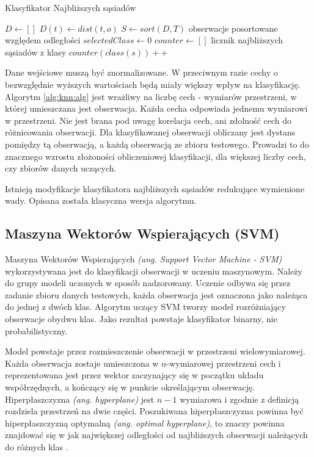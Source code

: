 \documentclass[a4paper,12pt,twoside,openany]{report}
\newcommand{\ang}[1]{\textit{(ang. #1)}}
\begin{document}
\begin{algorithm}
	\caption{Klasyfikator Najbliższych sąsiadów}
	\begin{algorithmic}[1]
		\State $D \leftarrow []$
		\State $D(t) \leftarrow dist(t, o)$
		\EndFor
		\State $S \leftarrow sort(D, T)$ \Comment obserwacje posortowane względem odległości
		\State $selectedClass \leftarrow 0$
		\State $counter \leftarrow []$ \Comment licznik najbliższych sąsiadów z klasy
		\Repeat
		\State $counter(class(s))++$
		\EndFor
		\EndProcedure
	\end{algorithmic}
	\label{alg:knn:alg}
\end{algorithm}

Dane wejściowe muszą być znormalizowane. 
W przeciwnym razie cechy o bezwzględnie wyższych wartościach będą miały większy wpływ na klasyfikację.
Algorytm \ref{alg:knn:alg} jest wrażliwy na liczbę cech - wymiarów przestrzeni, w której umieszczana jest obserwacja.
Każda cecha odpowiada jednemu wymiarowi w przestrzeni.
Nie jest brana pod uwagę korelacja cech, ani zdolność cech do różnicowania obserwacji.
Dla klasyfikowanej obserwacji obliczany jest dystans pomiędzy tą obserwacją,
a każdą obserwacją ze zbioru testowego.
Prowadzi to do znacznego wzrostu złożoności obliczeniowej klasyfikacji, dla większej liczby cech, czy zbiorów danych uczących.

Istnieją modyfikacje klasyfikatora najbliższych sąsiadów redukujące wymienione wady. 
Opisana została klasyczna wersja algorytmu.

\subsection{Maszyna Wektorów Wspierających (SVM)}

Maszyna Wektorów Wspierających \ang{Support Vector Machine - SVM} wykorzystywana jest do klasyfikacji obserwacji w uczeniu maszynowym.
Należy do grupy modeli uczonych w sposób nadzorowany. 
Uczenie odbywa się przez zadanie zbioru danych testowych, 
każda obserwacja jest oznaczona jako należąca do jednej z dwóch klas.
Algorytm uczący SVM tworzy model rozróżniający obserwacje obydwu klas.
Jako rezultat powstaje klasyfikator binarny, nie probabilistyczny. 

Model powstaje przez rozmieszczenie obserwacji w przestrzeni wielowymiarowej.
Każda obserwacja zostaje umieszczona w $n$-wymiarowej przestrzeni cech i reprezentowana jest przez wektor
zaczynający się w początku układu współrzędnych, a kończący się w punkcie określającym obserwację. 
Hiperpłaszczyzna \ang{hyperplane} jest $n-1$ wymiarowa i zgodnie z definicją rozdziela przestrzeń na dwie części.
Poszukiwana hiperpłaszczyzna powinna być hiperpłaszczyzną optymalną \ang{optimal hyperplane}, 
to znaczy powinna znajdować się w jak największej odległości od najbliższych obserwacji należących do różnych klas \cite{Cortes1995}.
\end{document}
